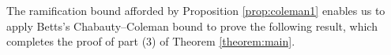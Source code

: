 \documentclass[11pt]{amsart}
\def\Q{\mathbb Q}
\newcommand{\Lie}{\mathrm{Lie}}
\newcommand{\Ker}{\mathrm{Ker}}
\theoremstyle{plain}
\newtheorem{theorem}{Theorem}
\newtheorem{lemma}{Lemma}
\theoremstyle{definition}
\newcommand{\nr}{\mathrm{nr}}
\newcommand{\F}{\mathbb{F}}
\newcommand{\netan}[1]{{\color{blue} \sf $\clubsuit\clubsuit\clubsuit$ Netan: [#1]}}
\begin{document}
The ramification bound afforded by Proposition \ref{prop:coleman1} enables us to apply Betts's Chabauty--Coleman bound to prove the following result, which completes the proof of part (3) of Theorem \ref{theorem:main}.
%
%
%
\end{document}
